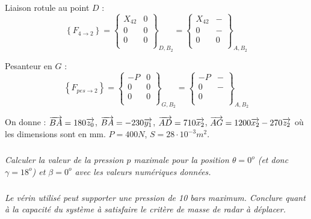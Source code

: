 \documentclass[10pt,fleqn]{article} %
\begin{document}
\begin{multicols}{2}
{\begin{corrige}
Liaison rotule au point $D$ :
$$
\left\{
F_{4 \rightarrow 2} 
\right\}
=
\left\{
\begin{array}{cc}
X_{42}  & 0 \\
0 & 0 \\
0 & 0 \\
\end{array}
\right\}_{D,B_2}
=
\left\{
\begin{array}{cc}
X_{42}  & -\\
0 & -\\
0 & 0 \\
\end{array}
\right\}_{A,B_2}
$$


Pesanteur en $G$ :
$$
\left\{
F_{pes \rightarrow 2} 
\right\}
=
\left\{
\begin{array}{cc}
-P  & 0 \\
0 & 0 \\
0 & 0 \\
\end{array}
\right\}_{G,B_2}
=
\left\{
\begin{array}{cc}
-P  & -\\
0 & -  \\
0 &  \\
\end{array}
\right\}_{A,B_2}
$$
\end{corrige}}{}

On donne : $\overrightarrow{BA}=180\overrightarrow{z_0}$, $\overrightarrow{BA}=-230\overrightarrow{y_1}$, $\overrightarrow{AD}=710\overrightarrow{x_2}$, $\overrightarrow{AG}=1200\overrightarrow{x_2}-270\overrightarrow{z_2}$ où les dimensions sont en mm. $P=400N$, $S=28\cdot 10^{-3}m^2$.

\subparagraph{}
\textit{Calculer la valeur de la pression $p$ maximale pour la position $\theta=0^o$ (et donc $\gamma = 18^o$) et $\beta = 0^o$ avec les valeurs numériques données.}


\subparagraph{}
\textit{Le vérin utilisé peut supporter une pression de 10 bars maximum. Conclure quant à la capacité du système à satisfaire le critère de masse de radar à déplacer.}

\end{multicols}
\end{document}
